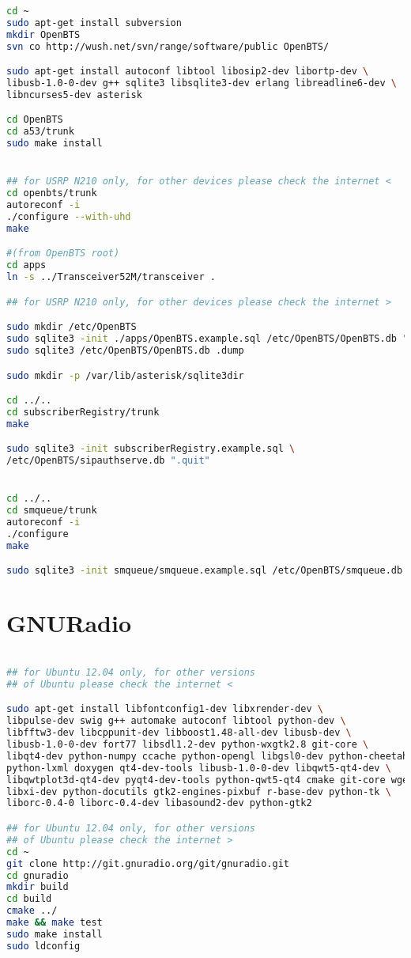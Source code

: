 \begin{lstlisting}[language=bash]
cd ~
sudo apt-get install subversion
mkdir OpenBTS
svn co http://wush.net/svn/range/software/public OpenBTS/

sudo apt-get install autoconf libtool libosip2-dev libortp-dev \
libusb-1.0-0-dev g++ sqlite3 libsqlite3-dev erlang libreadline6-dev \
libncurses5-dev asterisk

cd OpenBTS
cd a53/trunk
sudo make install


## for USRP N210 only, for other devices please check the internet <
cd openbts/trunk
autoreconf -i
./configure --with-uhd
make

#(from OpenBTS root)
cd apps
ln -s ../Transceiver52M/transceiver .

## for USRP N210 only, for other devices please check the internet >

sudo mkdir /etc/OpenBTS
sudo sqlite3 -init ./apps/OpenBTS.example.sql /etc/OpenBTS/OpenBTS.db ".quit"
sudo sqlite3 /etc/OpenBTS/OpenBTS.db .dump

sudo mkdir -p /var/lib/asterisk/sqlite3dir

cd ../..
cd subscriberRegistry/trunk
make

sudo sqlite3 -init subscriberRegistry.example.sql \
/etc/OpenBTS/sipauthserve.db ".quit"


cd ../..
cd smqueue/trunk
autoreconf -i
./configure
make

sudo sqlite3 -init smqueue/smqueue.example.sql /etc/OpenBTS/smqueue.db ".quit"

\end{lstlisting}


\section{GNURadio}

\begin{lstlisting}[language=bash]

## for Ubuntu 12.04 only, for other versions
## of Ubuntu please check the internet <

sudo apt-get install libfontconfig1-dev libxrender-dev \
libpulse-dev swig g++ automake autoconf libtool python-dev \
libfftw3-dev libcppunit-dev libboost1.48-all-dev libusb-dev \
libusb-1.0-0-dev fort77 libsdl1.2-dev python-wxgtk2.8 git-core \
libqt4-dev python-numpy ccache python-opengl libgsl0-dev python-cheetah \
python-lxml doxygen qt4-dev-tools libusb-1.0-0-dev libqwt5-qt4-dev \
libqwtplot3d-qt4-dev pyqt4-dev-tools python-qwt5-qt4 cmake git-core wget \
libxi-dev python-docutils gtk2-engines-pixbuf r-base-dev python-tk \
liborc-0.4-0 liborc-0.4-dev libasound2-dev python-gtk2

## for Ubuntu 12.04 only, for other versions 
## of Ubuntu please check the internet >
cd ~
git clone http://git.gnuradio.org/git/gnuradio.git
cd gnuradio
mkdir build
cd build
cmake ../
make && make test
sudo make install
sudo ldconfig

\end{lstlisting}